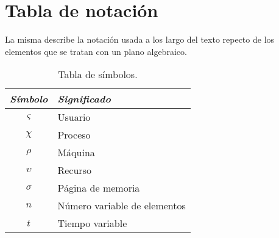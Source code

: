 \chapter*{Tabla de notaci\'on} 
La misma describe la notaci\'on usada a los largo del texto repecto de los elementos que se tratan con un plano algebraico.
\begin{table}[h]
\begin{center}
\begin{tabular}{|c|l|}
\hline
\textit{S\'imbolo} & \textit{Significado}\\ \hline 
\hline 
$\varsigma$ & Usuario \\ \hline
$\chi$ & Proceso \\ \hline
$\rho$ & M\'aquina \\ \hline
$\upsilon$ & Recurso \\ \hline
$\sigma$ & P\'agina de memoria \\ \hline
$n$ & N\'umero variable de elementos \\ \hline
$t$ & Tiempo variable \\ \hline
\end{tabular} 
\caption{Tabla de s\'imbolos.}
\end{center}
\end{table}
